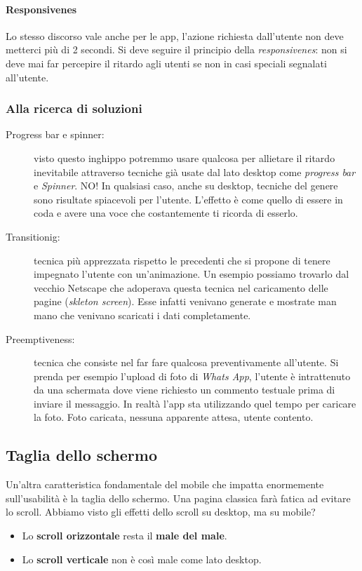 			\paragraph{Responsivenes}
				Lo stesso discorso vale anche per le app, l'azione richiesta dall'utente non deve metterci più di 2 secondi. Si deve seguire il principio della \emph{responsivenes}: non si deve mai far percepire il ritardo agli utenti se non in casi speciali segnalati all'utente.
				
			\subsubsection{Alla ricerca di soluzioni}
				\begin{description}
					\item[Progress bar e spinner:] visto questo inghippo potremmo usare qualcosa per allietare il ritardo inevitabile attraverso tecniche già usate dal lato desktop come \emph{progress bar} e \emph{Spinner}. NO! In qualsiasi caso, anche su desktop, tecniche del genere sono risultate spiacevoli per l'utente. L'effetto è come quello di essere in coda e avere una voce che costantemente ti ricorda di esserlo.
					\item[Transitionig:] tecnica più apprezzata rispetto le precedenti che si propone di tenere impegnato l'utente con un'animazione. Un esempio possiamo trovarlo dal vecchio Netscape che adoperava questa tecnica nel caricamento delle pagine (\emph{skleton screen}). Esse infatti venivano generate e mostrate man mano che venivano scaricati i dati completamente.
					\item[Preemptiveness:] tecnica che consiste nel far fare qualcosa preventivamente all'utente. Si prenda per esempio l'upload di foto di \emph{Whats App}, l'utente è intrattenuto da una schermata dove viene richiesto un commento testuale prima di inviare il messaggio. In realtà l'app sta utilizzando quel tempo per caricare la foto. Foto caricata, nessuna apparente attesa, utente contento.
				\end{description}
				
		\subsection{Taglia dello schermo}
			Un'altra caratteristica fondamentale del mobile che impatta enormemente sull'usabilità è la taglia dello schermo. Una pagina classica farà fatica ad evitare lo scroll. Abbiamo visto gli effetti dello scroll su desktop, ma su mobile?
			\begin{itemize}
				\item Lo \textbf{scroll orizzontale} resta il \textbf{male del male}.
				\item Lo \textbf{scroll verticale} non è così male come lato desktop.
			\end{itemize}
			
